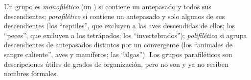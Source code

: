 \begin{definition}\label{def:b1:classifying-biodiversity:monophyly}
Un grupo es \emph{monofilético} (un ) si contiene un antepasado y todos
sus descendientes; \emph{parafilético} si contiene un antepasado y solo
algunos de sus descendientes (los ``reptiles'', que excluyen a las aves
descendidas de ellos; los ``peces'', que excluyen a los tetrápodos; los
``invertebrados''); \emph{polifilético} si agrupa descendientes de
antepasados distintos por un  convergente (los ``animales de sangre
caliente'', aves y mamíferos; las ``algas''). Los grupos parafiléticos son
descripciones útiles de grados de organización, pero no son  y ya no
reciben nombres formales.
\end{definition}

